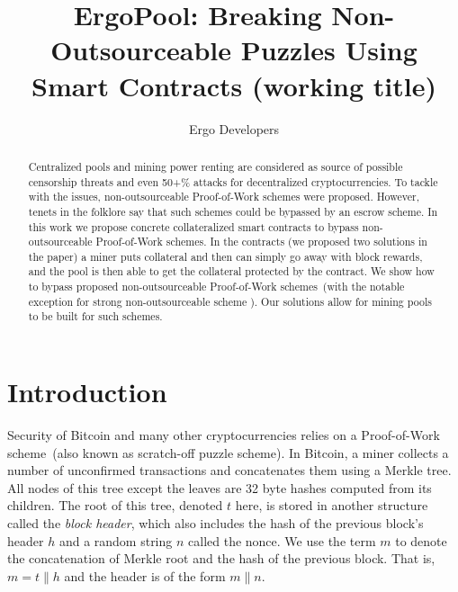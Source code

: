 \documentclass[11pt]{article}
\newcommand{\authnote}[2]{\marginpar{\parbox{\marginparwidth}{\tiny %
  \textsf{#1 {\textcolor{blue}{notes: #2}}}}}%
  \textcolor{blue}{\textbf{\dag}}}
\newcommand{\authnote}[2]{
  \textsf{#1 \textcolor{blue}{: #2}}}
\newcommand{\authnote}[2]{}
\newcommand{\knote}[1]{{\authnote{\textcolor{green}{kushti notes}}{#1}}}
\newcommand{\powname}{Autolykos\xspace}
\newcommand{\poolname}{ErgoPool\xspace}
\begin{document}
\title{\poolname: Breaking Non-Outsourceable Puzzles Using Smart Contracts (working title)}
\author{Ergo Developers}
\maketitle

\begin{abstract}
    Centralized pools and mining power renting are considered as source of possible censorship threats and even 50+\%
    attacks for decentralized cryptocurrencies. To tackle with the issues, non-outsourceable Proof-of-Work schemes were
    proposed. However, tenets in the folklore say that such schemes could be bypassed by an escrow scheme.
    In this work we propose concrete collateralized smart contracts to bypass non-outsourceable Proof-of-Work schemes.
    In the contracts (we proposed two solutions in the paper) a miner puts collateral and then can simply go away with
    block rewards, and the pool is then able to get the collateral protected by the contract. We show how to bypass
    proposed non-outsourceable Proof-of-Work schemes~(with the notable exception for strong non-outsourceable scheme
    \knote{link}). Our solutions allow for mining pools to be built for such schemes.

	
\end{abstract}

\section{Introduction}

Security of Bitcoin and many other cryptocurrencies relies on a Proof-of-Work scheme~(also known as scratch-off puzzle
scheme). In Bitcoin, a miner collects a number of unconfirmed transactions and concatenates them using a Merkle tree. All nodes of this tree except the leaves are 32 byte hashes computed from its children. The root of this tree, denoted $t$ here, is stored in another structure called the {\em block header}, which also includes the hash of the previous block's header $h$ and a random string $n$ called the nonce. We use the term $m$ to denote the concatenation of Merkle root and the hash of the previous block.
That is, $m = t\|h$ and the header is of the form $m\|n$.
\end{document}
